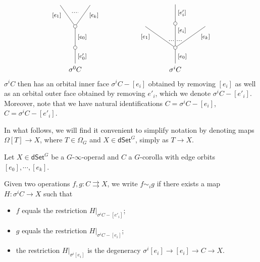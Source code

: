 \documentclass[a4paper,10pt
,draft
]{article}%
\renewcommand{\1}{\eta}%
\begin{document}
\[
\begin{tikzpicture}
[grow=up,auto,level distance=3em,
every node/.style = {font=\footnotesize},
dummy/.style={circle,draw,inner sep=0pt,minimum size=1.75mm}]
	\node at (0,0) [font=\normalsize]{$\sigma^0 C$}
		child{node [dummy] {}
			child{node [dummy] {}
				child{
				edge from parent node [swap,near end] {$[e_k]$} node [name=Kn] {}}
				child{
				edge from parent node [near end] {$[e_1]$}
node [name=Kone,swap] {}}
			edge from parent node [swap] {$[e_0]$}}
		edge from parent node [swap] {$[e'_0]$}
		};
		\draw [dotted,thick] (Kone) -- (Kn) ;
	\node at (5,0) [font=\normalsize]{$\sigma^i C$}
		child{node [dummy] {}
			child{
			edge from parent node [swap,near end] {$[e_k]$} node [near start,inner sep=1pt,name=Kn] {}}
			child[level distance=3.4em]{node [dummy] {}
				child[level distance=2.7em]{
				edge from parent node [swap] {$[e'_i]$}
}
			edge from parent node [near end,swap] {$[e_i]$}
node [near start,inner sep=1pt,name=Kone,swap] {}
node [near start,inner sep=1pt,name=Kone1] {}}
			child{
			edge from parent node [near end] {$[e_1]$}
node [swap] {}
node [near start,inner sep=1pt,name=Kn1,swap]{}}
		edge from parent node [swap] {$[e_0]$}
		};
		\draw [dotted,thick] (Kone) -- (Kn) ;
		\draw [dotted,thick] (Kone1) -- (Kn1) ;
\end{tikzpicture}
\]
$\sigma^i C$ then has an orbital inner face
$\sigma^i C - [e_i]$ obtained by removing $[e_i]$
as well as an orbital outer face obtained by removing $e'_i$,
which we denote $\sigma^i C - [e'_i]$.
Moreover, note that we have natural identifications
$C = \sigma^i C - [e_i]$,
$C = \sigma^i C - [e'_i]$.

In what follows, we will find it convenient to simplify notation by denoting maps $\Omega[T] \to X$,
where $T \in \Omega_G$ and $X \in \mathsf{dSet}^G$,
simply as $T \to X$.


\begin{definition}
	Let $X \in \mathsf{dSet}^G$ be a $G$-$\infty$-operad and $C$ a $G$-corolla with edge orbits
	$[e_0],\cdots,[e_k]$.
	
	Given two operations 
	$f,g\colon C \rightrightarrows X$,
	we write $f \sim_i g$ if there exists a map
	$H \colon \sigma^i C \to X$ such that
\begin{itemize}
\item $f$ equals the restriction $H|_{\sigma^i C-[e'_i]}$;
\item $g$ equals the restriction $H|_{\sigma^i C-[e_i]}$;
\item the restriction $H|_{\sigma^i [e_i]}$
is the degeneracy $\sigma^i [e_i] \to [e_i] \to C \to X$.
\end{itemize}
\end{definition}
\end{document}
